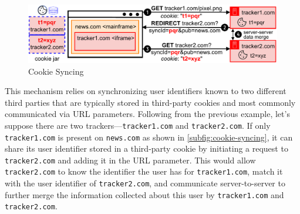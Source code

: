 \begin{figure}[htbp]
    \vspace{-3mm}
    \centering
    \includegraphics[width=1\linewidth]{figures/tracking-mechanisms-cookie-syncing.pdf}
    \caption{Cookie Syncing}
    \label{subfig:cookie-syncing}
    \vspace{-2mm}
\end{figure}

This mechanism relies on synchronizing user identifiers known to two different third parties that are typically stored in third-party cookies and most commonly communicated via URL parameters. 
%
Following from the previous example, let’s suppose there are two trackers---\texttt{tracker1.com} and \texttt{tracker2.com}. 
%
If only \texttt{tracker1.com} is present on \texttt{news.com} as shown in \autoref{subfig:cookie-syncing}, it can share its user identifier stored in a third-party cookie by initiating a request to \texttt{tracker2.com} and adding it in the URL parameter. 
%
This would allow \texttt{tracker2.com} to know the identifier the user has for \texttt{tracker1.com}, match it with the user identifier of \texttt{tracker2.com}, and communicate server-to-server to further merge the information collected about this user by \texttt{tracker1.com} and \texttt{tracker2.com}. 




